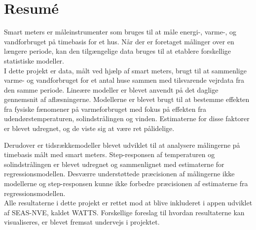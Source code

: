 \chapter{Resumé}
Smart meters er måleinstrumenter som bruges til at måle energi-, varme-, og vandforbruget på timebasis for et hus. Når der er foretaget målinger over en længere periode, kan den tilgængelige data bruges til at etablere forskellige statistiske modeller. \\

\noindent I dette projekt er data, målt ved hjælp af smart meters, brugt til at sammenlige varme- og vandforbruget for et antal huse sammen med tilsvarende vejrdata fra den samme periode. Lineære modeller er blevet anvendt på det daglige gennemsnit af aflæsningerne. Modellerne er blevet brugt til at bestemme effekten fra fysiske fænomener på varmeforbruget med fokus på effekten fra udendørstemperaturen, solindstrålingen og vinden. Estimaterne for disse faktorer er blevet udregnet, og de viste sig at være ret pålidelige. 

\noindent Derudover er tidsrækkemodeller blevet udviklet til at analysere målingerne på timebasis målt med smart meters. Step-responsen af temperaturen og solindstrålingen er blevet udregnet og sammenlignet med estimaterne for regressionsmodellen. Desværre understøttede præcisionen af målingerne ikke modellerne og step-responsen kunne ikke forbedre præcisionen af estimaterne fra regressionsmodellen. \\

\noindent Alle resultaterne i dette projekt er rettet mod at blive inkluderet i appen udviklet af SEAS-NVE, kaldet WATTS. Forskellige foreslag til hvordan resultaterne kan visualiseres, er blevet fremsat undervejs i projektet. 